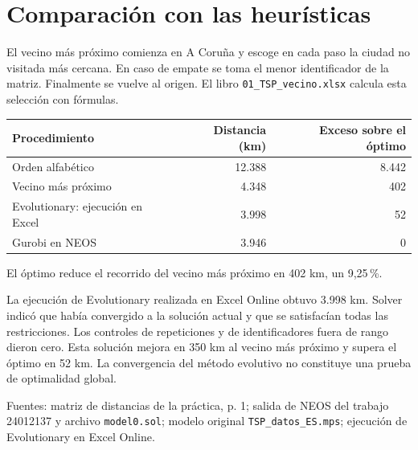 \documentclass[11pt,a4paper]{article}
\begin{document}
\section*{Comparación con las heurísticas}
El vecino más próximo comienza en A Coruña y escoge en cada paso la ciudad no visitada
más cercana. En caso de empate se toma el menor identificador de la matriz. Finalmente
se vuelve al origen. El libro \texttt{01\_TSP\_vecino.xlsx} calcula esta selección con fórmulas.

\begin{center}\begin{tabular}{lrr}\toprule
Procedimiento & Distancia (km) & Exceso sobre el óptimo \\\midrule
Orden alfabético & 12.388 & 8.442 \\
Vecino más próximo & 4.348 & 402 \\
Evolutionary: ejecución en Excel & 3.998 & 52 \\
Gurobi en NEOS & 3.946 & 0 \\\bottomrule
\end{tabular}\end{center}
El óptimo reduce el recorrido del vecino más próximo en 402 km, un 9,25\,\%.

La ejecución de Evolutionary realizada en Excel Online obtuvo 3.998 km. Solver indicó
que había convergido a la solución actual y que se satisfacían todas las restricciones.
Los controles de repeticiones y de identificadores fuera de rango dieron cero.
Esta solución mejora en 350 km al vecino más próximo y supera el óptimo en 52 km.
La convergencia del método evolutivo no constituye una prueba de optimalidad global.

\small Fuentes: matriz de distancias de la práctica, p. 1; salida de NEOS del trabajo
24012137 y archivo \texttt{model0.sol}; modelo original \texttt{TSP\_datos\_ES.mps};
ejecución de Evolutionary en Excel Online.
\end{document}
